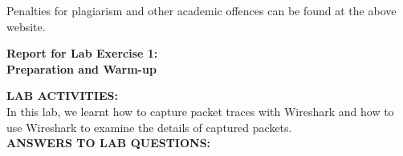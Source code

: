 \documentclass[12pt,letterpaper]{article}
\begin{document}
Penalties for plagiarism and other academic offences can be found at the above website.



\newpage
\begin{center}
    \Large \bf Report for Lab Exercise 1:\\Preparation and Warm-up \vspace*{12pt}
\end{center}


{\bf LAB ACTIVITIES:}
\\

In this lab, we learnt how to capture packet traces with Wireshark and how to use Wireshark to examine
the details of captured packets.
\\

{\bf ANSWERS TO LAB QUESTIONS:}
\end{document}
